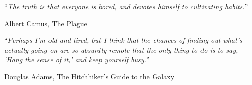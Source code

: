 \documentclass[
11pt, %
english, %
singlespacing, %
headsepline, %
]{MastersDoctoralThesis} %
\newcommand{\inlinetodo}[1]{\todo[inline,size=\normalsize]{#1}}
\begin{document}


\vspace*{0.2\textheight}

\noindent\enquote{\itshape The truth is that everyone is bored, and devotes himself to
cultivating habits.}\bigbreak

\hfill Albert Camus, The Plague

\vspace{2cm}

\noindent\enquote{\itshape Perhaps I'm old and tired, but I think that the chances of
finding out what's actually going on are so absurdly remote that the only thing to do
is to say, \enquote{Hang the sense of it,} and keep yourself busy.}\bigbreak

\hfill Douglas Adams, The Hitchhiker's Guide to the Galaxy






\end{document}

